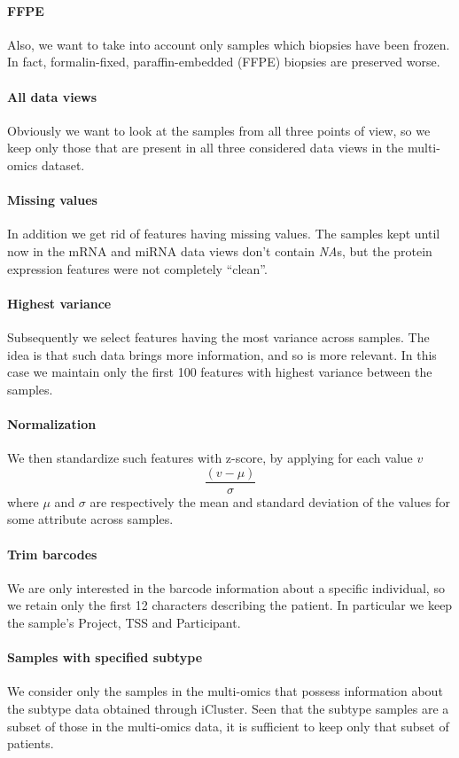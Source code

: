 \paragraph{FFPE} Also, we want to take into account only samples which biopsies have been frozen. In fact, formalin-fixed, paraffin-embedded (FFPE) biopsies are preserved worse.
\paragraph{All data views} Obviously we want to look at the samples from all three points of view, so we keep only those that are present in all three considered data views in the multi-omics dataset.
\paragraph{Missing values} In addition we get rid of features having missing values. The samples kept until now in the mRNA and miRNA data views don't contain \textit{NA}s, but the protein expression features were not completely ``clean''.\
\paragraph{Highest variance} Subsequently we select features having the most variance across samples. The idea is that such data brings more information, and so is more relevant. In this case we maintain only the first 100 features with highest variance between the samples.
\paragraph{Normalization} We then standardize such features with z-score, by applying for each value $v$
\begin{equation*}
    \frac{(v-\mu)}{\sigma}
\end{equation*}
where $\mu$ and $\sigma$ are respectively the mean and standard deviation of the values for some attribute across samples.
\paragraph{Trim barcodes} We are only interested in the barcode information about a specific individual, so we retain only the first 12 characters describing the patient. In particular we keep the sample's Project, TSS and Participant.
\paragraph{Samples with specified subtype} We consider only the samples in the multi-omics that possess information about the subtype data obtained through iCluster. Seen that the subtype samples are a subset of those in the multi-omics data, it is sufficient to keep only that subset of patients.

